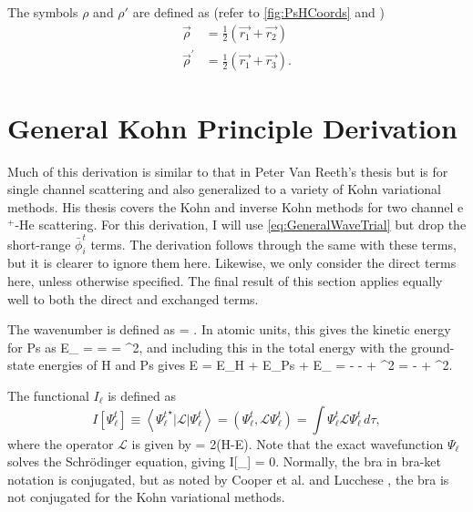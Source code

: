 \documentclass[Dissertation.tex]{subfiles}
\begin{document}
The symbols $\rho$ and $\rho'$ are defined as (refer to \cref{fig:PsHCoords} and )
\begin{subequations}
\begin{align}
\vec{\rho} &= \frac{1}{2}\left(\vec{r_1} + \vec{r_2}\right) \label{eq:RhoDef}\\
\vec{\rho}^\prime &= \frac{1}{2}\left(\vec{r_1} + \vec{r_3}\right) \label{eq:RhopDef}.
\end{align}
\end{subequations}


\section{General Kohn Principle Derivation}
\label{sec:KohnDerivation}

Much of this derivation is similar to that in Peter Van Reeth's thesis \cite{
VanReethThesis} but is for single channel scattering and also generalized to 
a variety of Kohn variational methods. His thesis covers the Kohn and inverse 
Kohn methods for two channel e$^+$-He scattering. For this derivation, I will 
use \cref{eq:GeneralWaveTrial} but drop the short-range $\bar{\phi}_i^t$ 
terms. The derivation follows through the same with these terms, but it is 
clearer to ignore them here. Likewise, we only consider the direct terms 
here, unless otherwise specified. The final result of this section applies 
equally well to both the direct and exchanged terms.

The wavenumber is defined as
\beq
\label{eq:Wavenumber}
\kappa = .
\eeq
In atomic units, this gives the kinetic energy for Ps as
\beq
E_{\bm \kappa} =  =  =  \kappa^2,
\label{eq:Wavenumber}
\eeq
and including this in the total energy with the ground-state energies of H and Ps gives
\beq
E = E_H + E_{Ps} + E_{\bm \kappa} = - -  +  \kappa^2 = - +  \kappa^2.
\eeq

The functional $I_\ell$ is defined as \cite{Adhikari1998}
\begin{equation}
I[\Psi_\ell^t]\equiv \left<{\Psi_\ell^t}^\star | \mathcal{L} | \Psi_\ell^t \right> = \left(\Psi_\ell^t, \mathcal{L} \Psi_\ell^t \right) = \int \Psi_\ell^t \mathcal{L}
  \Psi_\ell^t \,d\tau,
\label{eq:IlDefPsi}
\end{equation}
where the operator $\mathcal{L}$ is given by
\beq
\label{eq:LDef}
 = 2(H-E).
\eeq
Note that the exact wavefunction $\Psi_\ell$ solves the Schr\"{o}dinger equation, giving
\beq
\label{eq:Il0}
I[\Psi_\ell] = 0.
\eeq
\label{BraNote}Normally, the bra in bra-ket notation is conjugated,
but as noted by Cooper et al. \cite{Cooper2010}
and Lucchese \cite{Lucchese1989}, the bra is not conjugated for the Kohn variational methods.
\end{document}

